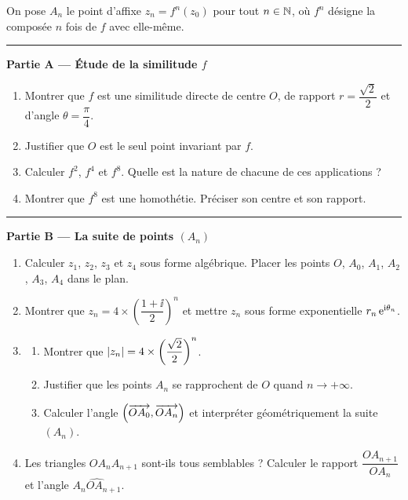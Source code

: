 On pose $A_n$ le point d'affixe $z_n = f^n(z_0)$ pour tout $n \in \mathbb{N}$,
où $f^n$ désigne la composée $n$ fois de $f$ avec elle-même.

\bigskip
\noindent\rule{\linewidth}{0.3pt}
\bigskip

\noindent\textbf{Partie A — Étude de la similitude $f$}

\begin{enumerate}
	\item Montrer que $f$ est une similitude directe de centre $O$,
	de rapport $r = \dfrac{\sqrt{2}}{2}$ et d'angle $\theta = \dfrac{\pi}{4}$.

	\item Justifier que $O$ est le seul point invariant par $f$.

	\item Calculer $f^2$, $f^4$ et $f^8$.
	Quelle est la nature de chacune de ces applications ?

	\item Montrer que $f^8$ est une homothétie. Préciser son centre et son rapport.
\end{enumerate}

\bigskip
\noindent\rule{\linewidth}{0.3pt}
\bigskip

\noindent\textbf{Partie B — La suite de points $(A_n)$}

\begin{enumerate}
	\item Calculer $z_1$, $z_2$, $z_3$ et $z_4$ sous forme algébrique.
	Placer les points $O$, $A_0$, $A_1$, $A_2$, $A_3$, $A_4$ dans le plan.

	\item Montrer que $z_n = 4 \times \left(\dfrac{1+\ii}{2}\right)^n$
	et mettre $z_n$ sous forme exponentielle $r_n\,\mathrm{e}^{\mathrm{i}\theta_n}$.

	\item \begin{enumerate}
		\item Montrer que $\left|z_n\right| = 4 \times \left(\dfrac{\sqrt{2}}{2}\right)^n$.
		\item Justifier que les points $A_n$ se rapprochent de $O$ quand $n \to +\infty$.
		\item Calculer l'angle $\left(\overrightarrow{OA_0}, \overrightarrow{OA_n}\right)$ et interpréter
		géométriquement la suite $(A_n)$.
	\end{enumerate}

	\item Les triangles $OA_nA_{n+1}$ sont-ils tous semblables ?
	Calculer le rapport $\dfrac{OA_{n+1}}{OA_n}$ et l'angle $\widehat{A_nOA_{n+1}}$.
\end{enumerate}

